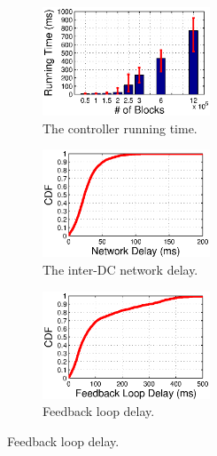 \begin{figure}[t]
        \centering
        \begin{subfigure}[b]{0.3\textwidth}
                \centering
                \includegraphics[width=50mm]{images/CPUvsBlk_v3.eps}%
                \caption{The controller running time.}
                \label{fig:scale:cpu}
        \end{subfigure}
        \begin{subfigure}[b]{0.3\textwidth}
                \centering
                \includegraphics[width=50mm]{images/NetworkDelay.eps}%
                \caption{The inter-DC network delay.}
                \label{fig:scale:network}
        \end{subfigure}
        \begin{subfigure}[b]{0.3\textwidth}
                \centering
                \includegraphics[width=50mm]{images/CDFofFeedbackLoopDelay.eps}
                \caption{Feedback loop delay.}
                \label{fig:scale:feedback}
        \end{subfigure}
        \label{fig:scale}
\end{figure}

